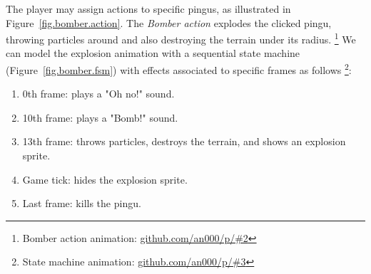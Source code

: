 \documentclass[times,twocolumn,final]{elsarticle}
\begin{document}
The player may assign actions to specific pingus, as illustrated in
Figure~\ref{fig.bomber.action}.
%
The \emph{Bomber action} explodes the clicked pingu, throwing particles around
and also destroying the terrain under its radius.%
\footnote{Bomber action animation: \url{github.com/an000/p/#2} }
%
We can model the explosion animation with a sequential state machine
(Figure~\ref{fig.bomber.fsm}) with effects associated to specific frames as
follows%
\footnote{State machine animation: \url{github.com/an000/p/#3} }:
%
\begin{enumerate}
\item 0th frame:  plays a "Oh no!" sound.
\item 10th frame: plays a "Bomb!" sound.
\item 13th frame: throws particles, destroys the terrain, and shows an
                  explosion sprite.
\item Game tick:  hides the explosion sprite.
\item Last frame: kills the pingu.
\end{enumerate}

\end{document}
